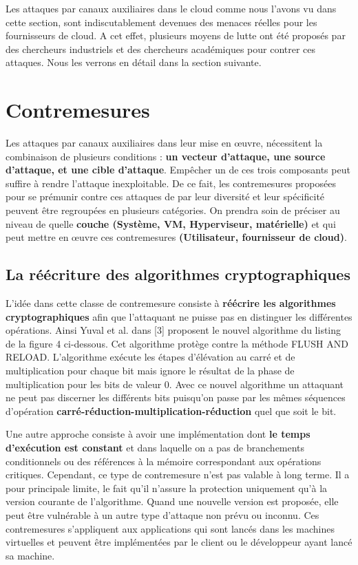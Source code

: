 Les attaques par canaux auxiliaires dans le cloud  comme nous l’avons vu dans cette section, sont  indiscutablement  devenues des menaces réelles pour les fournisseurs de cloud. A cet effet, plusieurs  moyens de lutte ont été proposés par des chercheurs  industriels et des chercheurs académiques  pour contrer ces attaques. Nous les verrons en détail dans la section suivante.

\section{Contremesures} 

Les attaques par canaux auxiliaires dans leur mise en œuvre, nécessitent la combinaison de plusieurs conditions : \textbf{ un vecteur d’attaque, une source d’attaque, et une cible d’attaque}. Empêcher un de ces trois composants peut suffire à rendre l’attaque inexploitable. De ce fait, les contremesures proposées pour se prémunir contre  ces attaques  de par leur diversité et leur spécificité peuvent  être regroupées en plusieurs catégories. On prendra  soin de préciser au niveau de quelle \textbf{couche (Système, VM, Hyperviseur, matérielle)} et qui peut mettre en œuvre ces contremesures \textbf{(Utilisateur, fournisseur de cloud)}.

\subsection{La réécriture des algorithmes cryptographiques}
L’idée dans cette classe de contremesure consiste à  \textbf{ réécrire  les algorithmes cryptographiques} afin que l’attaquant ne puisse pas  en distinguer les différentes opérations. Ainsi  Yuval et al. dans [3] proposent le nouvel algorithme du listing de la figure 4 ci-dessous. Cet algorithme protège contre la méthode FLUSH AND RELOAD. L’algorithme exécute les étapes d’élévation au carré et de multiplication pour chaque bit mais ignore le résultat de la phase de multiplication pour les bits de valeur 0. Avec ce nouvel algorithme un attaquant ne peut pas discerner les différents bits puisqu’on passe par les mêmes séquences d’opération \textbf{ carré-réduction-multiplication-réduction} quel que soit le bit.\newline{}

Une autre approche \cite{Bernstein} consiste à avoir une implémentation dont \textbf{ le temps d’exécution est constant} et dans laquelle on a pas de branchements conditionnels ou des références à la mémoire correspondant aux opérations critiques. Cependant, ce type de contremesure  n’est pas valable à long terme. Il a pour principale limite, le fait  qu’il  n’assure la protection uniquement qu’à la version courante de l’algorithme. Quand une nouvelle  version est proposée, elle peut être vulnérable à un autre type d’attaque non prévu ou inconnu. Ces contremesures s’appliquent aux applications qui sont lancés dans les machines virtuelles et peuvent être implémentées par le client ou le développeur ayant lancé sa machine.

